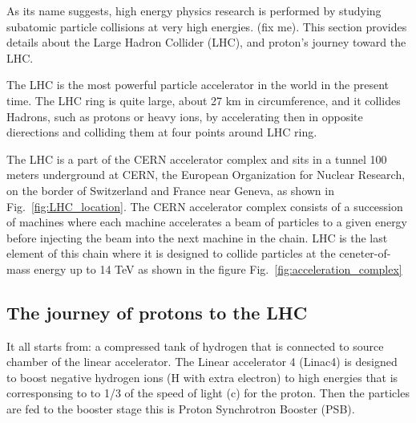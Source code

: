 
As its name suggests, high energy physics research is performed by studying subatomic particle collisions at very high energies. (fix me).
This section provides details about the Large Hadron Collider (LHC), and proton's journey toward the LHC. %

The LHC is the most powerful particle accelerator in the world in the present time. 
The LHC ring is quite large, about 27 km in circumference, and it collides Hadrons, such as protons or heavy ions, by accelerating then in opposite dierections and colliding them at four points around LHC ring. 

The LHC is a part of the CERN accelerator complex and sits in a tunnel 100 meters underground at CERN, the European Organization for Nuclear Research, on the border of Switzerland and France near Geneva, as shown in Fig.~\ref{fig:LHC_location}. The CERN accelerator complex consists of a succession of machines where each machine accelerates a beam of particles to a given energy before injecting the beam into the next machine in the chain. LHC is the last element of this chain where it is designed to collide particles at the ceneter-of-mass energy up to 14 TeV as shown in the figure Fig.~\ref{fig:acceleration_complex}



\subsection{The journey of protons to the LHC}
It all starts from: a compressed tank of hydrogen that is connected to source chamber of the linear accelerator. The Linear accelerator 4 (Linac4) is designed to boost negative hydrogen ions (H with extra electron) to high energies that is corresponsing to to 1/3 of the speed of light (c) for the proton. Then the particles are fed to the booster stage this is Proton Synchrotron Booster (PSB).

